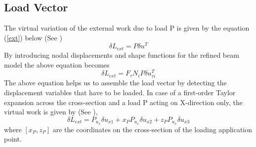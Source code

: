 \documentclass[a4paper,12pt]{article}
\begin{document}
\subsection*{Load Vector}
\indent\indent\indent\indent The virtual variation of the external work due to load P is given by the equation (\ref{ext}) below (See \cite{carrera2011beam})           
\begin{equation}
\delta L_{ext} = P\delta u^{T}
\label{ext}
\end{equation}
By introducing nodal displacements and shape functions for the refined beam model the above equation becomes 
\begin{equation}
\delta L_{ext} = F_{\tau}N_{i}P\delta u^{T}_{\tau i}
\end{equation}
The above equation helps us to assemble the load vector  by detecting the displacement variables that have to be loaded. In case of a first-order Taylor expansion across the cross-section and a load P acting on X-direction only, the virtual work is given by (See \cite{carrera2011beam}),
\begin{equation}
\delta L_{ext} = P_{u_{x}}\delta u_{x1} + x_{P} P_{u_{x}}\delta u_{x2} + z_{P} P_{u_{x}}\delta u_{x3}
\end{equation}
where $[x_{P}, z_{P}] $ are the coordinates on the cross-section of the loading
application point.\\
\end{document}
